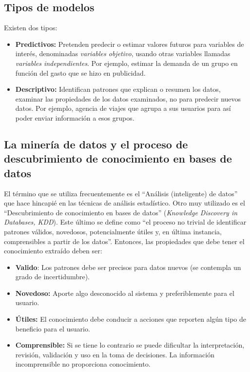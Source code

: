\documentclass{article}
\begin{document}
\subsection{Tipos de modelos}

Existen dos tipos:

\begin{itemize}
  \item \textbf{Predictivos:} Pretenden predecir o estimar valores futuros para variables de interés, denominadas \textit{variables objetivo}, usando otras variables llamadas \textit{variables independientes}. Por ejemplo, estimar la demanda de un grupo en función del gasto que se hizo en publicidad.
  \item \textbf{Descriptivo:} Identifican patrones que explican o resumen los datos, examinar las propiedades de los datos examinados, no para predecir nuevos datos. Por ejemplo, agencia de viajes que agrupa a sus usuarios para así poder enviar información a esos grupos.
\end{itemize}

\subsection{La minería de datos y el proceso de descubrimiento de conocimiento en bases de datos}

El término que se utiliza frecuentemente es el ``Análisis (inteligente) de datos'' que hace
hincapié en las técnicas de análisis estadístico. Otro muy utilizado es el ``Descubrimiento de
conocimiento en bases de datos'' (\textit{Knowledge Discovery in Databases, KDD}). Este último se
define como ``el proceso no trivial de identificar patrones válidos, novedosos, potencialmente
útiles y, en última instancia, comprensibles a partir de los datos''. Entonces, las propiedades que debe tener el conocimiento extraído deben ser:

\begin{itemize}
  \item \textbf{Valido}: Los patrones debe ser precisos para datos nuevos (se contempla un grado de incertidumbre).
  \item \textbf{Novedoso:} Aporte algo desconocido al sistema y preferiblemente para el usuario.
  \item \textbf{Útiles:} El conocimiento debe conducir a acciones que reporten algún tipo de beneficio para el usuario.
  \item \textbf{Comprensible:} Si se tiene lo contrario se puede dificultar la interpretación, revisión, validación y uso en la toma de decisiones. La información
        incomprensible no proporciona conocimiento.
\end{itemize}
\end{document}
